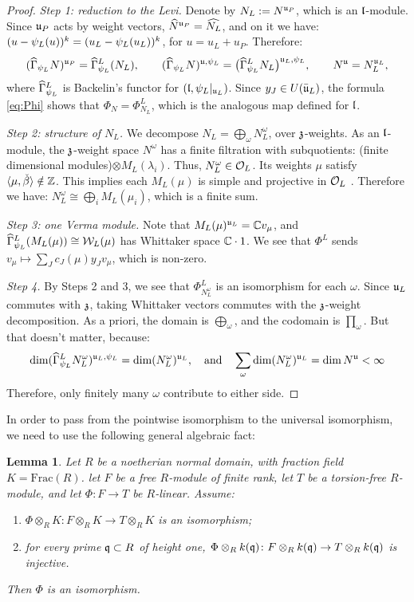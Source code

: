 \documentclass{article}
\theoremstyle{plain}
\newtheorem{lemma}[theorem]{Lemma}
\theoremstyle{definition}
\theoremstyle{remark}
\numberwithin{equation}{section}
\begin{document}
\begin{proof}
\emph{Step 1: reduction to the Levi.} Denote by $N_L:=N^{\mathfrak{u}_P}$, which is an $\mathfrak{l}$-module. Since $\mathfrak{u}_P$ acts by weight vectors, $\widehat N^{\mathfrak{u}_P}=\widehat{N_L}$, and on it we have: $(u-\psi_L(u))^k=(u_L-\psi_L(u_L))^k$, for $u=u_L+u_P$. Therefore:
\[
(\widehat\Gamma_{\psi_L}N)^{\mathfrak{u}_P}=\widehat\Gamma^L_{\psi_L}(N_L),\qquad
(\widehat\Gamma_{\psi_L}N)^{\mathfrak{u},\psi_L}=\bigl(\widehat\Gamma^L_{\psi_L}N_L\bigr)^{\mathfrak{u}_L,\psi_L},\qquad
N^{\mathfrak{u}}=N_L^{\mathfrak{u}_L},
\]
where $\widehat\Gamma^L_{\psi_L}$ is Backelin's functor for $(\mathfrak{l},\psi_L|_{\mathfrak{u}_L})$. Since $y_J\in U(\bar{\mathfrak{u}}_L)$, the formula \eqref{eq:Phi} shows that $\Phi_N=\Phi^L_{N_L}$, which is the analogous map defined for $\mathfrak{l}$.

\emph{Step 2: structure of $N_L$.} We decompose $N_L=\bigoplus_\omega N_L^\omega$, over $\mathfrak{z}$-weights. As an $\mathfrak{l}$-module, the $\mathfrak{z}$-weight space $N^\omega$ has a finite filtration with subquotients: (finite dimensional modules)$\otimes M_L(\lambda_i)$. Thus, $N_L^\omega\in\mathcal{O}_L$. Its weights $\mu$ satisfy $\langle\mu,\check\beta\rangle\notin\mathbb{Z}$. This implies each $M_L(\mu)$ is simple and projective in $\mathcal{O}_L$ \cite[Proposition 3.8, Theorem 4.8]{humphreysrepresentations}. Therefore we have: $N_L^\omega\cong\bigoplus_i M_L(\mu_i)$, which is a finite sum.

\emph{Step 3: one Verma module.} Note that $M_L(\mu)^{\mathfrak{u}_L}=\mathbb{C} v_\mu$, and $\widehat\Gamma^L_{\psi_L}(M_L(\mu))\cong\mathcal{W}_L(\mu)$ has Whittaker space $\mathbb{C}\cdot1$. We see that $\Phi^L$ sends $v_\mu \longmapsto \sum_Jc_J(\mu)y_Jv_\mu$, which is non-zero.

\emph{Step 4.} By Steps 2 and 3, we see that $\Phi^L_{N_L^\omega}$ is an isomorphism for each $\omega$. Since $\mathfrak{u}_L$ commutes with $\mathfrak{z}$, taking Whittaker vectors commutes with the $\mathfrak{z}$-weight decomposition. As a priori, the domain is $\bigoplus_\omega$, and the codomain is $\prod_\omega$. But that doesn't matter, because:
\[
\dim(\widehat\Gamma^L_{\psi_L}N_L^\omega)^{\mathfrak{u}_L,\psi_L}=\dim(N_L^\omega)^{\mathfrak{u}_L}, \quad \mathrm{and} \quad \sum_\omega\dim(N_L^\omega)^{\mathfrak{u}_L}=\dim N^{\mathfrak{u}}<\infty
\]
Therefore, only finitely many $\omega$ contribute to either side.
\end{proof}

In order to pass from the pointwise isomorphism to the universal isomorphism, we need to use the following general algebraic fact:
\begin{lemma}\label{lem:height-one}
Let $R$ be a noetherian normal domain, with fraction field $K =\mathrm{Frac}(R)$. let $F$ be a free $R$-module of finite rank, let $T$ be a torsion-free $R$-module, and let $\Phi\colon F\to T$ be $R$-linear. Assume:
\begin{enumerate}[label=(\roman*)]
\item $\Phi\otimes_RK\colon F\otimes_RK\to T\otimes_RK$ is an isomorphism;
\item for every prime $\mathfrak q\subset R$ of height one, $\Phi\otimes_Rk(\mathfrak q)\colon F\otimes_Rk(\mathfrak q)\to T\otimes_Rk(\mathfrak q)$ is injective.
\end{enumerate}
Then $\Phi$ is an isomorphism.
\end{lemma}
\end{document}
